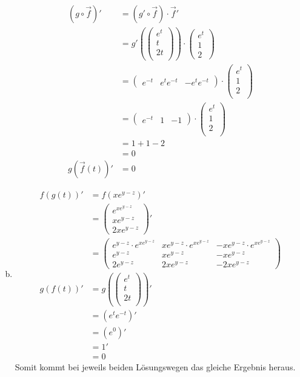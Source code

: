 \documentclass[10pt,a4paper,parskip=half]{scrartcl}
\newcommand{\vecthree}[3]{\begin{pmatrix}#1\\#2\\#3\\\end {pmatrix}}
\begin{document}
\begin{enumerate}[(a)]
\begin{align*}
(g \circ \vec f)' &= (g' \circ \vec f) \cdot \vec f' \\
&= g'(\vecthree{e^t}{t}{2t}) \cdot \begin{pmatrix}e^t \\1 \\2 \end{pmatrix}\\
&= \begin{pmatrix}e^{-t} & e^te^{-t} & -e^te^{-t}\end{pmatrix} \cdot \vecthree{e^t}{1}{2} \\
&= \begin{pmatrix}e^{-t} & 1 & -1\end{pmatrix} \cdot \vecthree{e^t}{1}{2} \\
&= 1 + 1 - 2\\
&= 0\\
g(\vec f(t))' &= 0
\end{align*}
\item
\begin{align*}
f\left(g(t)\right)' &= f\left( xe^{y-z} \right)'\\
&= \begin{pmatrix}
e^{xe^{y-z}}\\
xe^{y-z}\\
2xe^{y-z}
\end{pmatrix}'\\
&= \begin{pmatrix}
e^{y-z} \cdot e^{xe^{y-z}} & xe^{y-z}\cdot e^{xe^{y-z}} & -xe^{y-z}\cdot e^{xe^{y-z}}\\
e^{y-z} & xe^{y-z} & -xe^{y-z}\\
2e^{y-z} & 2xe^{y-z} & -2xe^{y-z}
\end{pmatrix} \\
g(f(t))' &= g(\vecthree{e^t}{t}{2t})' \\
&= (e^te^{-t})' \\
&= (e^0)' \\
&= 1' \\
&= 0
\end{align*}
Somit kommt bei jeweils beiden Lösungswegen das gleiche Ergebnis heraus.
\end{enumerate}
\end{document}
